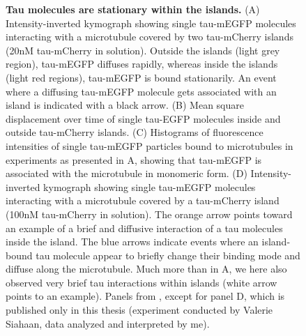 \begin{figure}
{	\textbf{Tau molecules are stationary within the islands.} (A) Intensity-inverted kymograph showing single tau-mEGFP molecules interacting with a microtubule covered by two tau-mCherry islands (20nM tau-mCherry in solution). Outside the islands (light grey region), tau-mEGFP diffuses rapidly, whereas inside the islands (light red regions), tau-mEGFP is bound stationarily. An event where a diffusing tau-mEGFP molecule gets associated with an island is indicated with a black arrow. (B) Mean square displacement over time of single tau-EGFP molecules inside and outside tau-mCherry islands. (C) Histograms of fluorescence intensities of single tau-mEGFP particles bound to microtubules in experiments as presented in A, showing that tau-mEGFP is associated with the microtubule in monomeric form. (D) Intensity-inverted kymograph showing single tau-mEGFP molecules interacting with a microtubule covered by a tau-mCherry island (100nM tau-mCherry in solution). The orange arrow points toward an example of a brief and diffusive interaction of a tau molecules inside the island. The blue arrows indicate events where an island-bound tau molecule appear to briefly change their binding mode and diffuse along the microtubule. Much more than in A, we here also observed very brief tau interactions within islands (white arrow points to an example). Panels from \cite{Siahaan2019a}, except for panel D, which is published only in this thesis (experiment conducted by Valerie Siahaan, data analyzed and interpreted by me).
		}\label{tausingle}
\end{figure}
